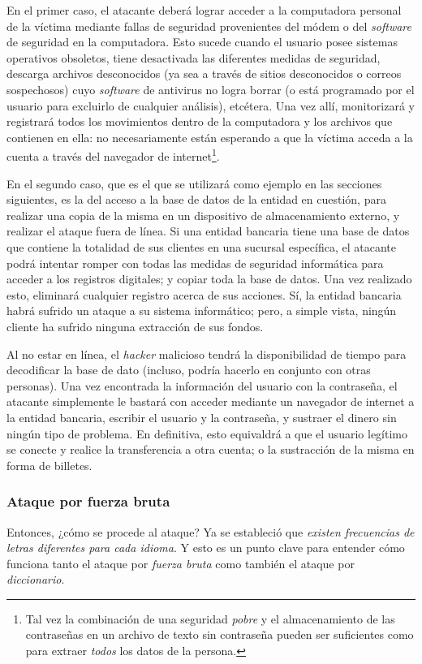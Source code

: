 \documentclass[12pt,a4paper,twoside]{book}
\begin{document}
En el primer caso, el atacante deberá lograr acceder a la computadora personal de la víctima mediante fallas de seguridad provenientes del módem o del \textit{software} de seguridad en la computadora. Esto sucede cuando el usuario posee sistemas operativos obsoletos, tiene desactivada las diferentes medidas de seguridad, descarga archivos desconocidos (ya sea a través de sitios desconocidos o correos sospechosos) cuyo \textit{software} de antivirus no logra borrar (o está programado por el usuario para excluirlo de cualquier análisis), etcétera. Una vez allí, monitorizará y registrará todos los movimientos dentro de la computadora y los archivos que contienen en ella: no necesariamente están esperando a que la víctima acceda a la cuenta a través del navegador de internet\footnote{Tal vez la combinación de una seguridad \textit{pobre} y el almacenamiento de las contraseñas en un archivo de texto sin contraseña pueden ser suficientes como para extraer \textit{todos} los datos de la persona.}.

En el segundo caso, que es el que se utilizará como ejemplo en las secciones siguientes, es la del acceso a la base de datos de la entidad en cuestión, para realizar una copia de la misma en un dispositivo de almacenamiento externo, y realizar el ataque fuera de línea. Si una entidad bancaria tiene una base de datos que contiene la totalidad de sus clientes en una sucursal específica, el atacante podrá intentar romper con todas las medidas de seguridad informática para acceder a los registros digitales; y copiar toda la base de datos. Una vez realizado esto, eliminará cualquier registro acerca de sus acciones. Sí, la entidad bancaria habrá sufrido un ataque a su sistema informático; pero, a simple vista, ningún cliente ha sufrido ninguna extracción de sus fondos.

Al no estar en línea, el \textit{hacker} malicioso tendrá la disponibilidad de tiempo para decodificar la base de dato (incluso, podría hacerlo en conjunto con otras personas). Una vez encontrada la información del usuario con la contraseña, el atacante simplemente le bastará con acceder mediante un navegador de internet a la entidad bancaria, escribir el usuario y la contraseña, y sustraer el dinero sin ningún tipo de problema. En definitiva, esto equivaldrá a que el usuario legítimo se conecte y realice la transferencia a otra cuenta; o la sustracción de la misma en forma de billetes.

\subsubsection{Ataque por fuerza bruta}
Entonces, ¿cómo se procede al ataque? Ya se estableció que \textit{existen frecuencias de letras diferentes para cada idioma}. Y esto es un punto clave para entender cómo funciona tanto el ataque por \textit{fuerza bruta} como también el ataque por \textit{diccionario}.
\end{document}
